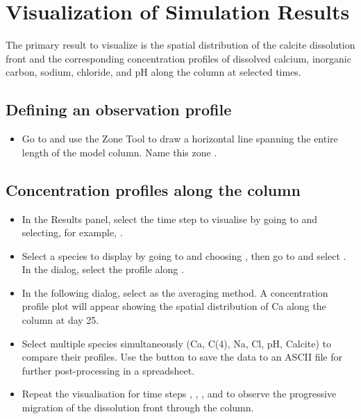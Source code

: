 \section{Visualization of Simulation Results}

The primary result to visualize is the spatial distribution of the
calcite dissolution front and the corresponding concentration profiles
of dissolved calcium, inorganic carbon, sodium, chloride, and pH along
the column at selected times.

\subsection{Defining an observation profile}

\begin{itemize}

\item Go to  and use the Zone Tool to draw a
  horizontal line spanning the entire length of the model column.  Name
  this zone .

\end{itemize}

\subsection{Concentration profiles along the column}

\begin{itemize}

\item In the Results panel, select the time step to visualise by going
  to  and
  selecting, for example, .

\item Select a species to display by going to  and choosing ,
  then go to  and select
  .  In the dialog, select the profile along
  .

\item In the following dialog, select  as the averaging
  method.  A concentration profile plot will appear showing the spatial
  distribution of Ca along the column at day 25.

\item Select multiple species simultaneously (Ca, C(4), Na, Cl, pH,
  Calcite) to compare their profiles.  Use the  button to
  save the data to an ASCII file for further post-processing in a
  spreadsheet.

\item Repeat the visualisation for time steps ,
  , , and  to observe the
  progressive migration of the dissolution front through the column.

\end{itemize}

